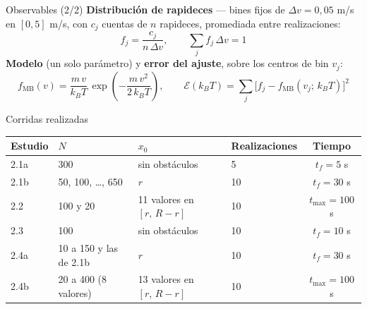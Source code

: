 \begin{frame}{Observables (2/2)}
  \small
  \abovedisplayskip=3pt \belowdisplayskip=3pt
  \abovedisplayshortskip=0pt \belowdisplayshortskip=2pt
  \textbf{Distribución de rapideces} --- bines fijos de $\Delta v = 0{,}05$ m/s en $[0, 5]$ m/s, con $c_j$ cuentas de $n$ rapideces, promediada entre realizaciones:
  \[
    f_j = \frac{c_j}{n\,\Delta v},
    \qquad
    \sum_j f_j\,\Delta v = 1
  \]
  \textbf{Modelo} (un solo parámetro) y \textbf{error del ajuste}, sobre los centros de bin $v_j$:
  \[
    f_{\mathrm{MB}}(v) = \frac{m\,v}{k_B T}\,\exp\!\left( -\frac{m\,v^2}{2\,k_B T} \right),
    \qquad
    \mathcal{E}(k_B T) = \sum_j \big[ f_j - f_{\mathrm{MB}}(v_j;\, k_B T) \big]^2
  \]
\end{frame}

\begin{frame}{Corridas realizadas}
  \centering
  \footnotesize
  \setlength{\tabcolsep}{5pt}
  \begin{tabular}{@{}llllc@{}}
    \toprule
    Estudio & $N$ & $x_0$ & Realizaciones & Tiempo \\
    \midrule
    2.1a & 300 & sin obstáculos & 5 & $t_f = 5$ s \\
    2.1b & 50, 100, \dots, 650 & $r$ & 10 & $t_f = 30$ s \\
    2.2 & 100 y 20 & 11 valores en $[r,\, R - r]$ & 10 & $t_{\max} = 100$ s \\
    2.3 & 100 & sin obstáculos & 10 & $t_f = 10$ s \\
    2.4a & 10 a 150 y las de 2.1b & $r$ & 10 & $t_f = 30$ s \\
    2.4b & 20 a 400 (8 valores) & 13 valores en $[r,\, R - r]$ & 10 & $t_{\max} = 100$ s \\
    \bottomrule
  \end{tabular}

  \vspace{1.2em}
  \raggedright
\end{frame}

